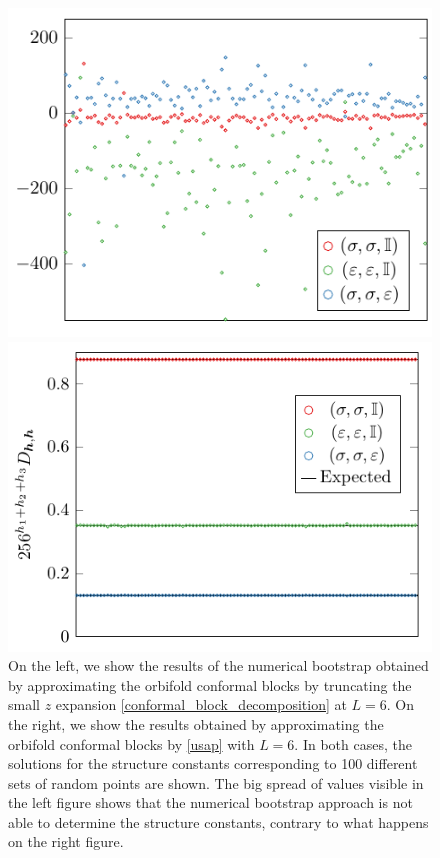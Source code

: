 \documentclass[a4paper,11pt]{article}
\begin{document}
\begin{figure}[t]
\label{comparison}
 \begin{minipage}{0.5\linewidth}
 \centering 
 \includegraphics[width=\textwidth]{bootstrap_ising_3_x.pdf}
\end{minipage}
 \begin{minipage}{0.5\linewidth}
 \centering 
 \includegraphics[width=\textwidth]{bootstrap_ising_3_new.pdf}
\end{minipage}
\caption{On the left,  we show the results of the numerical bootstrap obtained by approximating the orbifold conformal blocks by truncating  the small $z$ expansion \eqref{conformal_block_decomposition} at $L=6$. On the right, we show the results obtained by approximating the orbifold conformal blocks by  \eqref{usap} with $L=6$. In both cases, the solutions for the structure constants corresponding to 100 different sets of random points are shown. The big spread of values visible in the left figure shows that the numerical bootstrap approach is not able to determine the structure constants, contrary to what happens on the right figure.}
\end{figure}
\end{document}
